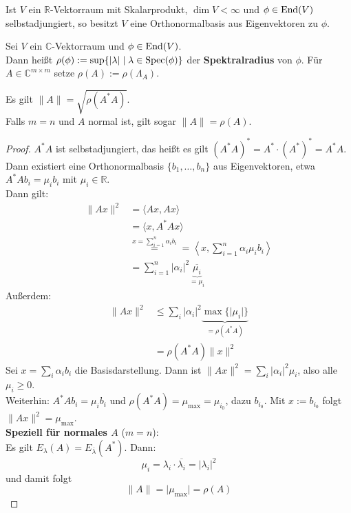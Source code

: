 \documentclass[parskip,a4paper,twoside,DIV15,BCOR12mm]{scrbook}
\begin{document}
\begin{corollary}
Ist \(V\) ein \(\mathbb{R}\)-Vektorraum mit Skalarprodukt, \(\dim V<\infty\) und
\(\phi\in\operatorname{End}(V)\) selbstadjungiert, so besitzt \(V\) eine Orthonormalbasis aus
Eigenvektoren zu \(\phi\).
\end{corollary}
\begin{definition}
Sei \(V\) ein \(\mathbb{C}\)-Vektorraum und \(\phi\in\operatorname{End}(V)\).\\
Dann heißt \(\rho(\phi):=\sup\{\lvert\lambda\rvert\mid\lambda\in\operatorname{Spec}(\phi)\}\)
der \textbf{Spektralradius} von \(\phi\). Für \(A\in\mathbb{C}^{m\times m}\)
setze \(\rho(A):=\rho(\Lambda_{A})\).
\end{definition}

\begin{comment}
Auf \(\mathbb{K}^{m\times n}\) ist durch
\[
\lVert A\rVert:=\sup\{\lVert A\rVert\mid x\in\mathbb{K}^{n},\lVert x\rVert\leq1\}
\]
eine Norm definiert.
\end{comment}
\begin{theo}
\label{Satz 18.4}
Es gilt \(\lVert A\rVert=\sqrt{\rho(A^{*}A)}\).\\
Falls \(m=n\) und \(A\) normal ist, gilt sogar \(\lVert A\rVert=\rho(A)\).
\end{theo}
\begin{proof}
\(A^{*}A\) ist selbstadjungiert, das heißt es gilt 
\((A^{*}A)^{*}=A^{*}\cdot\left(A^{*}\right)^{*}=A^{*}A\).\\
Dann existiert eine Orthonormalbasis \(\{b_{1},\ldots,b_{n}\}\) aus 
Eigenvektoren, etwa \(A^{*}Ab_{i}=\mu_{i}b_{i}\) mit \(\mu_{i}\in\mathbb{R}\).\\
Dann gilt:
\begin{align*}
\lVert Ax\rVert^{2}&=\langle Ax,Ax\rangle\\
&=\langle x,A^{*}Ax\rangle\\
&\overset{x=\sum_{i=1}^{n}{\alpha_{i}b_{i}}}{=}=\left\langle x,\sum_{i=1}^{n}{\alpha_{i}\mu_{i}b_{i}}\right\rangle\\
&=\sum_{i=1}^{n}\lvert\alpha_{i}\rvert^{2}\underbrace{\overline{\mu_{i}}}_{=\mu_{i}}
\end{align*}
Außerdem:
\begin{align*}
\lVert Ax\rVert^{2}&\leq\sum_{i}\lvert\alpha_{i}\rvert^{2}\underbrace{\max\{\lvert\mu_{i}\rvert\}}_{=\rho(A^{*}A)}\\
&=\rho(A^{*}A)\lVert x\rVert^{2}
\end{align*}
Sei \(x=\sum_{i}{\alpha_{i}b_{i}}\) die Basisdarstellung. Dann ist 
\(\lVert Ax\rVert^{2}=\sum_{i}{\lvert\alpha_{i}\rvert^{2}\mu_{i}}\), also alle
\(\mu_{i}\geq0\).\\
Weiterhin: \(A^{*}Ab_{i}=\mu_{i}b_{i}\) und \(\rho(A^{*}A)=\mu_{\max}=\mu_{i_{0}}\),
dazu \(b_{i_{0}}\). Mit \(x:=b_{i_{0}}\) folgt \(\lVert Ax\rVert^{2}=\mu_{\max}\).\\
\textbf{Speziell für normales \(A\)} (\(m=n\)):\\
Es gilt \(E_{\lambda}(A)=E_{\overline{\lambda}}(A^{*})\). Dann:
\[
\mu_{i}=\lambda_{i}\cdot\overline{\lambda_{i}}=\lvert\lambda_{i}\rvert^{2}
\]
und damit folgt 
\[
\lVert A\rVert=\lvert\mu_{\max}\rvert=\rho(A)
\]
\end{proof}
\end{document}

